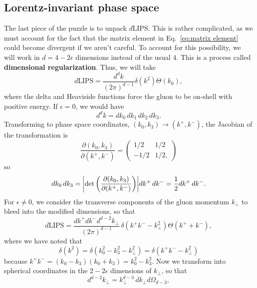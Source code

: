\documentclass[11pt,twoside,reqno]{amsart}
\theoremstyle{plain}
\theoremstyle{remark}
\theoremstyle{definition}
\theoremstyle{remark}
\theoremstyle{definition}
\theoremstyle{definition}
\newcommand{\LIPS}{\mathrm{LIPS}}
\begin{document}
\subsection{Lorentz-invariant phase space}
	The last piece of the puzzle is to unpack $d\LIPS$. This is rather complicated, as we must account for the fact that the matrix element in Eq.\ \ref{eq:matrix element} could become divergent if we aren't careful. To account for this possibility, we will work in $d = 4 - 2\epsilon$ dimensions instead of the usual $4$. This is a process called \textbf{dimensional regularization}. Thus, we will take
	\begin{equation}
		d\LIPS = \frac{d^d k}{(2\pi)^{d - 1}} \delta(k^2) \Theta(k_0),
	\end{equation}
	where the delta and Heaviside functions force the gluon to be on-shell with positive energy. If $\epsilon = 0$, we would have
	\begin{equation}
		d^d k = dk_0\,dk_1\,dk_2\,dk_3.
	\end{equation}
	Transforming to phase space coordinates, $(k_0, k_3) \to (k^+, k^-)$, the Jacobian of the transformation is
	\begin{equation}
		\frac{\partial(k_0, k_3)}{\partial(k^+, k^-)} = \begin{pmatrix}
			1/2 & 1/2 \\ -1/2 & 1/2,
		\end{pmatrix}
	\end{equation}
	so
	\begin{equation}
		dk_0\,dk_3 = \abs{\det\qty(\frac{\partial(k_0, k_3)}{\partial(k^+, k^-)})} dk^+\,dk^- = \frac{1}{2}dk^+\,dk^-.
	\end{equation}
	For $\epsilon \neq 0$, we consider the transverse components of the gluon momentum $k_\perp$ to bleed into the modified dimensions, so that
	\begin{equation}
		d\LIPS = \frac{dk^+ dk^- d^{d - 2}k_\perp}{(2\pi)^{d - 1}}\,\delta(k^+ k^- - k_\perp^2)\Theta(k^+ + k^-),
	\end{equation}
	where we have noted that
	\begin{equation}
		\delta(k^2) = \delta(k_0^2 - k_3^2 - k_\perp^2) = \delta(k^+ k^- - k_\perp^2)
	\end{equation}
	because $k^+ k^- = (k_0 - k_3)(k_0 + k_3) = k_0^2  - k_3^2$. Now we transform into spherical coordinates in the $2 - 2\epsilon$ dimensions of $k_\perp$, so that
	\begin{equation}
		d^{d - 2} k_\perp = k_\perp^{d - 3} \, dk_\perp d\Omega_{d - 3},
	\end{equation}
\end{document}
